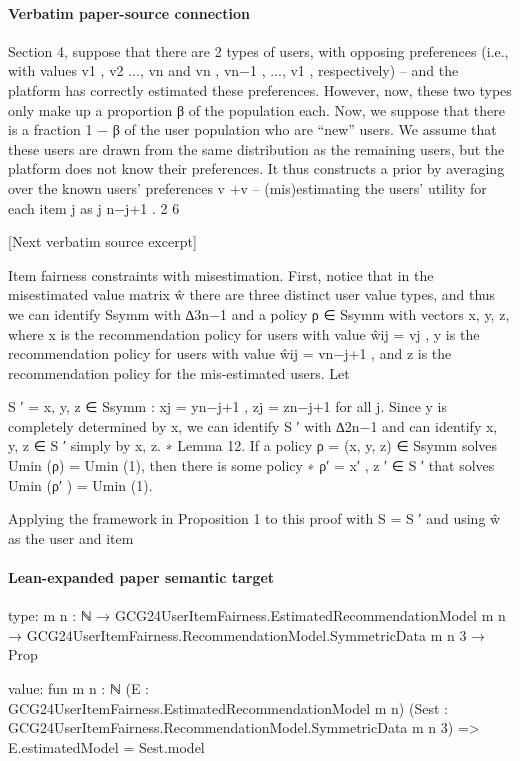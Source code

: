 \documentclass[10pt]{article}
\begin{document}
\paragraph{Verbatim paper-source connection}
\begin{ReviewVerbatim}
Section 4, suppose that there are 2 types of users, with opposing preferences (i.e., with values
v1 , v2 ..., vn and vn , vn−1 , ..., v1 , respectively) – and the platform has correctly estimated these
preferences. However, now, these two types only make up a proportion β of the population each.
Now, we suppose that there is a fraction 1 − β of the user population who are “new” users. We assume
that these users are drawn from the same distribution as the remaining users, but the platform does
not know their preferences. It thus constructs a prior by averaging over the known users’ preferences
v +v
– (mis)estimating the users’ utility for each item j as j n−j+1
.
2
6


[Next verbatim source excerpt]

Item fairness constraints with misestimation. First, notice that in the misestimated value matrix
ŵ there are three distinct user value types, and thus we can identify Ssymm with ∆3n−1 and a policy
ρ ∈ Ssymm with vectors x, y, z, where x is the recommendation policy for users with value ŵij = vj ,
y is the recommendation policy for users with value ŵij = vn−j+1 , and z is the recommendation
policy for the mis-estimated users.
Let

S ′ = {x, y, z ∈ Ssymm : xj = yn−j+1 , zj = zn−j+1 for all j}.
Since y is completely determined by x, we can identify S ′ with ∆2n−1 and can identify x, y, z ∈ S ′
simply by x, z.
∗
Lemma 12. If a policy ρ = (x, y, z) ∈ Ssymm solves Umin (ρ) = Umin
(1), then there is some policy
∗
ρ′ = x′ , z ′ ∈ S ′ that solves Umin (ρ′ ) = Umin
(1).

Applying the framework in Proposition 1 to this proof with S = S ′ and using ŵ as the user and item
\end{ReviewVerbatim}



\paragraph{Lean-expanded paper semantic target}
\begin{ReviewVerbatim}
type:
{m n : ℕ} →
  GCG24UserItemFairness.EstimatedRecommendationModel m n →
    GCG24UserItemFairness.RecommendationModel.SymmetricData m n 3 → Prop

value:
fun {m n : ℕ} (E : GCG24UserItemFairness.EstimatedRecommendationModel m n)
    (Sest : GCG24UserItemFairness.RecommendationModel.SymmetricData m n 3) =>
  E.estimatedModel = Sest.model
\end{ReviewVerbatim}
\end{document}
